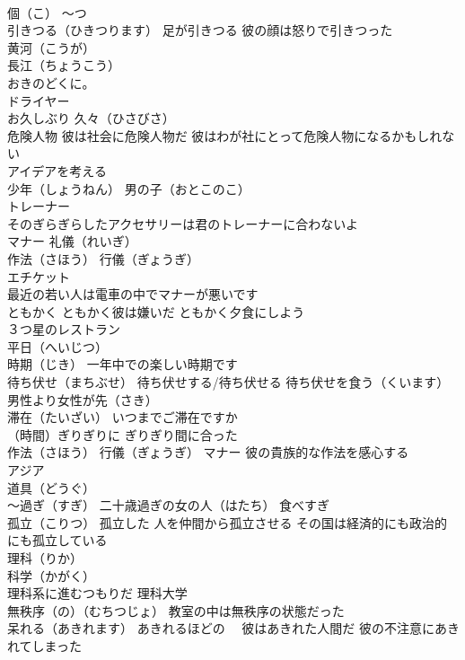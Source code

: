 \documentclass[8pt]{extreport}
\begin{document}
\begin{CJK}{UTF8}{min}
\\	個（こ） ～つ
\\	引きつる（ひきつります） 足が引きつる 彼の顔は怒りで引きつった
\\	黄河（こうが） 
\\	長江（ちょうこう）
\\	おきのどくに。
\\	ドライヤー
\\	お久しぶり 久々（ひさびさ）
\\	危険人物 彼は社会に危険人物だ 彼はわが社にとって危険人物になるかもしれない
\\	アイデアを考える
\\	少年（しょうねん） 男の子（おとこのこ）
\\	トレーナー 
\\	そのぎらぎらしたアクセサリーは君のトレーナーに合わないよ
\\	マナー 礼儀（れいぎ） 
\\	作法（さほう） 行儀（ぎょうぎ） 
\\	エチケット 
\\	最近の若い人は電車の中でマナーが悪いです
\\	ともかく ともかく彼は嫌いだ ともかく夕食にしよう
\\	３つ星のレストラン
\\	平日（へいじつ）
\\	時期（じき） 一年中での楽しい時期です
\\	待ち伏せ（まちぶせ） 待ち伏せする/待ち伏せる 待ち伏せを食う（くいます）
\\	男性より女性が先（さき）
\\	滞在（たいざい） いつまでご滞在ですか
\\	（時間）ぎりぎりに ぎりぎり間に合った
\\	作法（さほう） 行儀（ぎょうぎ） マナー 彼の貴族的な作法を感心する
\\	アジア
\\	道具（どうぐ）
\\	～過ぎ（すぎ） 二十歳過ぎの女の人（はたち） 食べすぎ
\\	孤立（こりつ） 孤立した 人を仲間から孤立させる その国は経済的にも政治的にも孤立している
\\	理科（りか）
\\	科学（かがく） 
\\	理科系に進むつもりだ 理科大学
\\	無秩序（の）（むちつじょ） 教室の中は無秩序の状態だった
\\	呆れる（あきれます） あきれるほどの　 彼はあきれた人間だ 彼の不注意にあきれてしまった

\end{CJK}
\end{document}
